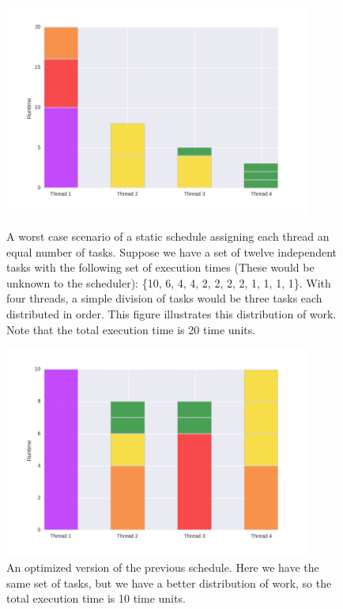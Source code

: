 \begin{figure}[!]
	\centering
	\includegraphics[width=0.9\textwidth]{graphics/unoptimized_schedule.png}
	\caption{A worst case scenario of a static schedule assigning each thread an equal number of tasks. Suppose we have a set of twelve independent tasks with the following set of execution times (These would be unknown to the scheduler): \{10, 6, 4, 4, 2, 2, 2, 2, 1, 1, 1, 1\}. With four threads, a simple division of tasks would be three tasks each distributed in order. This figure illustrates this distribution of work. Note that the total execution time is 20 time units.}
	\includegraphics[width=0.9\textwidth]{graphics/optimized_schedule.png}
	\caption{An optimized version of the previous schedule. Here we have the same set of tasks, but we have a better distribution of work, so the total execution time is 10 time units.}
	\label{fig:schedule_optimization}
\end{figure}



